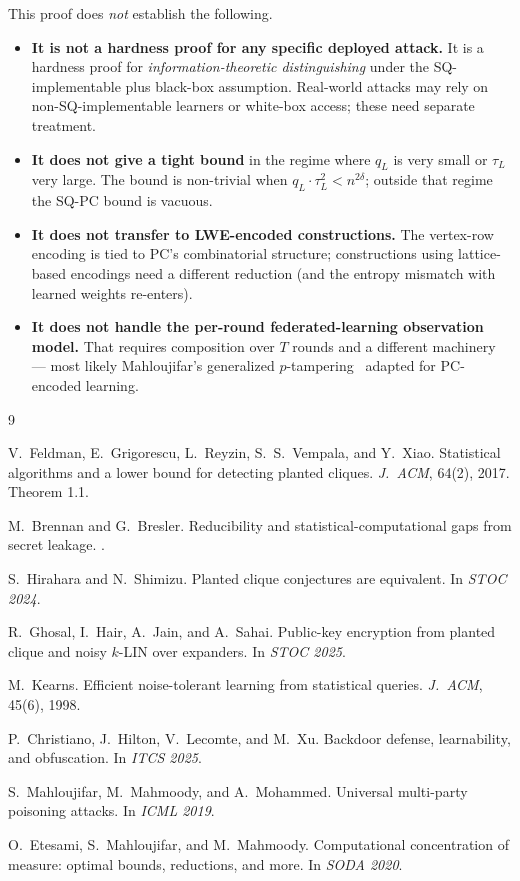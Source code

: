 \documentclass[11pt,a4paper]{article}
\theoremstyle{definition}
\theoremstyle{remark}
\begin{document}
This proof does \emph{not} establish the following.
\begin{itemize}
  \item \textbf{It is not a hardness proof for any specific deployed attack.} It is a hardness proof for \emph{information-theoretic distinguishing} under the SQ-implementable plus black-box assumption. Real-world attacks may rely on non-SQ-implementable learners or white-box access; these need separate treatment.
  \item \textbf{It does not give a tight bound} in the regime where $q_L$ is very small or $\tau_L$ very large. The bound is non-trivial when $q_L \cdot \tau_L^2 < n^{2\delta}$; outside that regime the SQ-PC bound is vacuous.
  \item \textbf{It does not transfer to LWE-encoded constructions.} The vertex-row encoding is tied to PC's combinatorial structure; constructions using lattice-based encodings need a different reduction (and the entropy mismatch with learned weights re-enters).
  \item \textbf{It does not handle the per-round federated-learning observation model.} That requires composition over $T$ rounds and a different machinery --- most likely Mahloujifar's generalized $p$-tampering~\cite{MMM19} adapted for PC-encoded learning.
\end{itemize}

\begin{thebibliography}{9}

V.~Feldman, E.~Grigorescu, L.~Reyzin, S.~S.~Vempala, and Y.~Xiao.
\newblock Statistical algorithms and a lower bound for detecting planted cliques.
\newblock \emph{J.\ ACM}, 64(2), 2017. Theorem 1.1.

M.~Brennan and G.~Bresler.
\newblock Reducibility and statistical-computational gaps from secret leakage.
.

S.~Hirahara and N.~Shimizu.
\newblock Planted clique conjectures are equivalent.
\newblock In \emph{STOC 2024}.

R.~Ghosal, I.~Hair, A.~Jain, and A.~Sahai.
\newblock Public-key encryption from planted clique and noisy $k$-LIN over expanders.
\newblock In \emph{STOC 2025}.

M.~Kearns.
\newblock Efficient noise-tolerant learning from statistical queries.
\newblock \emph{J.\ ACM}, 45(6), 1998.

P.~Christiano, J.~Hilton, V.~Lecomte, and M.~Xu.
\newblock Backdoor defense, learnability, and obfuscation.
\newblock In \emph{ITCS 2025}.

S.~Mahloujifar, M.~Mahmoody, and A.~Mohammed.
\newblock Universal multi-party poisoning attacks.
\newblock In \emph{ICML 2019}.

O.~Etesami, S.~Mahloujifar, and M.~Mahmoody.
\newblock Computational concentration of measure: optimal bounds, reductions, and more.
\newblock In \emph{SODA 2020}.

\end{thebibliography}
\end{document}
